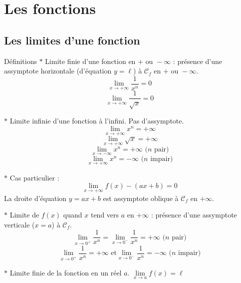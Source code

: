 \section{Les fonctions}
\subsection{Les limites d'une fonction}

\begin{bclogo}{Définitions}
$\ast$ Limite finie d'une fonction en $+ \text{ ou } -\infty$ : présence d'une assymptote horizontale (d'équation $y=\ell$) à $\mathcal{C}_f$ en $+ \text{ ou } - \infty$.
\[\lim\limits_{x \to +\infty} \dfrac{1}{x^n}=0\]
\[\lim\limits_{x \to +\infty} \dfrac{1}{\sqrt{x}}=0\]


$\ast$ Limite infinie d'une fonction à l'infini. Pas d'assymptote.
\[\lim\limits_{x \to +\infty} x^n=+\infty\]
\[\lim\limits_{x \to +\infty} \sqrt{x}=+\infty\]
\[\lim\limits_{x \to -\infty} x^n=+\infty  \text{ ($n$ pair)}\]
\[\lim\limits_{x \to +\infty} x^n=-\infty  \text{ ($n$ impair)}\]


$\ast$ Cas particulier : \[\lim\limits_{x \to +\infty} f(x)-(ax+b) =0\]
La droite d'équation $y=ax+b$ est assymptote oblique à $\mathcal{C}_f$ en $+ \infty$.

$\ast$ Limite de $f(x)$ quand $x$ tend vers $a$ en $+\infty$ : présence d'une assymptote verticale ($x=a$) à $\mathcal{C}_f$.
\[\lim\limits_{x \to 0^+} \dfrac{1}{x^n}= \lim\limits_{x \to 0^-} \dfrac{1}{x^n}=+\infty \text{ ($n$ pair)}\]
\[\lim\limits_{x \to 0^+} \dfrac{1}{x^n}=+\infty \text{ et}  \lim\limits_{x \to 0^-} \dfrac{1}{x^n}=-\infty \text{ ($n$ impair)}\]

$\ast$ Limite finie de la fonction en un réel $a$. $\lim\limits_{x \to a} f(x)=\ell$

\end{bclogo}

\medskip

